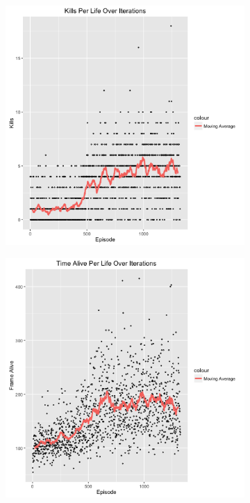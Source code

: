\documentclass{article}
\begin{document}
\begin{multicols}{2}
\begin{figure}[H]
\caption{Results for Baseline}
\begin{subfigure}{.25\textwidth}
  \centering
  \includegraphics[scale=0.27]{./kills.png}
  \caption{}
\end{subfigure}
\begin{subfigure}{.25\textwidth}
  \centering
  \includegraphics[scale=0.27]{./time.png}

\end{subfigure}
\end{figure}
\end{multicols}
\end{document}
